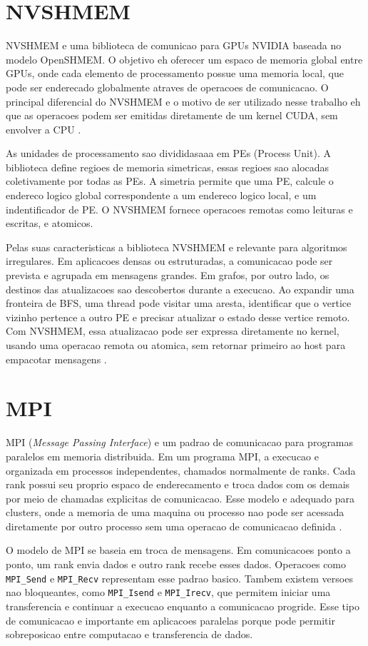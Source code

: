 \section{NVSHMEM}
NVSHMEM e uma biblioteca de comunicao para GPUs NVIDIA baseada no modelo OpenSHMEM. 
O objetivo eh oferecer um espaco de memoria global entre GPUs, onde cada elemento de 
processamento possue uma memoria local, que pode ser enderecado globalmente atraves de
operacoes de comunicacao. O principal diferencial do NVSHMEM e o motivo de ser utilizado
nesse trabalho eh que as operacoes podem ser emitidas diretamente de um kernel CUDA,
sem envolver a CPU \cite{hsunvshmem}.

As unidades de processamento sao divididasaaa em PEs (Process Unit). A biblioteca define
regioes de memoria simetricas, essas regioes sao alocadas coletivamente por todas as PEs.
A simetria permite que uma PE, calcule o endereco logico global correspondente a um
endereco logico local, e um indentificador de PE. O NVSHMEM fornece operacoes remotas
como leituras e escritas, e atomicos.

Pelas suas caracteristicas a biblioteca NVSHMEM e relevante para algoritmos irregulares.
Em aplicacoes densas ou estruturadas, a comunicacao pode ser prevista e agrupada
em mensagens grandes. Em grafos, por outro lado, os destinos das atualizacoes
sao descobertos durante a execucao. Ao expandir uma fronteira de BFS, uma thread
pode visitar uma aresta, identificar que o vertice vizinho pertence a outro PE e
precisar atualizar o estado desse vertice remoto. Com NVSHMEM, essa atualizacao
pode ser expressa diretamente no kernel, usando uma operacao remota ou atomica,
sem retornar primeiro ao host para empacotar mensagens \cite{hsunvshmem}.

\section{MPI}
MPI (\textit{Message Passing Interface}) e um padrao de comunicacao para
programas paralelos em memoria distribuida. Em um programa MPI, a execucao e
organizada em processos independentes, chamados normalmente de ranks. Cada rank
possui seu proprio espaco de enderecamento e troca dados com os demais por meio
de chamadas explicitas de comunicacao. Esse modelo e adequado para clusters,
onde a memoria de uma maquina ou processo nao pode ser acessada diretamente por
outro processo sem uma operacao de comunicacao definida \cite{mpistandard}.

O modelo de MPI se baseia em troca de mensagens. Em comunicacoes ponto a ponto,
um rank envia dados e outro rank recebe esses dados. Operacoes como
\texttt{MPI\_Send} e \texttt{MPI\_Recv} representam esse padrao basico. Tambem
existem versoes nao bloqueantes, como \texttt{MPI\_Isend} e
\texttt{MPI\_Irecv}, que permitem iniciar uma transferencia e continuar a
execucao enquanto a comunicacao progride. Esse tipo de comunicacao e importante
em aplicacoes paralelas porque pode permitir sobreposicao entre computacao e
transferencia de dados.

